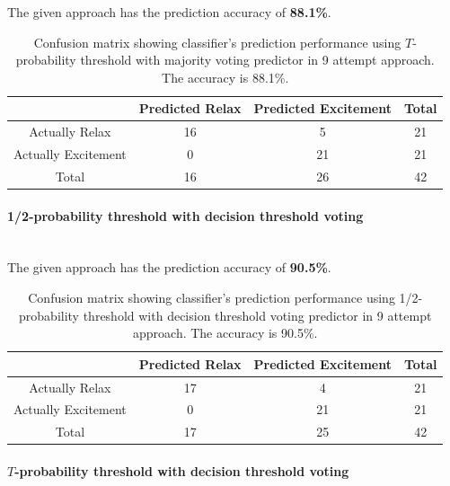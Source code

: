 \documentclass[12pt]{article}
\theoremstyle{definition}
\begin{document}
The given approach has the prediction accuracy of \textbf{88.1\%}.  
\begin{table}[H]
\begin{center}
  \begin{tabular}{ | c | c | c | c | }
    \hline
     & Predicted Relax & Predicted Excitement & Total \\ \hline
    Actually Relax & 16 & 5 & 21 \\ \hline
    Actually Excitement & 0 & 21 & 21 \\ \hline
    Total & 16 & 26 & 42 \\ 
    \hline
  \end{tabular}
\end{center}
\caption{Confusion matrix showing classifier's prediction performance using $T$-probability threshold with majority voting predictor in 9 attempt approach. The accuracy is 88.1\%.} 
\end{table}

\paragraph{1/2-probability threshold with decision threshold voting}~\\

The given approach has the prediction accuracy of \textbf{90.5\%}.  
\begin{table}[H]
\begin{center}
  \begin{tabular}{ | c | c | c | c | }
    \hline
     & Predicted Relax & Predicted Excitement & Total \\ \hline
    Actually Relax & 17 & 4 & 21 \\ \hline
    Actually Excitement & 0 & 21 & 21 \\ \hline
    Total & 17 & 25 & 42 \\ 
    \hline
  \end{tabular}
\end{center}
\caption{Confusion matrix showing classifier's prediction performance using 1/2-probability threshold with decision threshold voting predictor in 9 attempt approach. The accuracy is 90.5\%.} 
\end{table}

\paragraph{$T$-probability threshold with decision threshold voting}~\\
\end{document}
